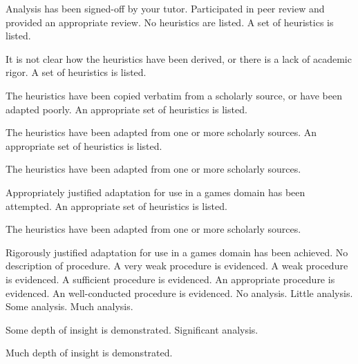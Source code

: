 \documentclass{../fal_assignment}
\begin{document}
\begin{markingrubric}
%
        \grade 		Analysis has been signed-off by your tutor.
%
        \grade 		Participated in peer review and provided an appropriate review.
%
        \grade\fail 	No heuristics are listed.
        \grade 		A set of heuristics is listed.
        \par 		It is not clear how the heuristics have been derived, or there is a lack of academic rigor.
        \grade 		A set of heuristics is listed.
        \par 		The heuristics have been copied verbatim from a scholarly source, or have been adapted poorly.
        \grade 		An appropriate set of heuristics is listed.
        \par 		The heuristics have been adapted from one or more scholarly sources.
        \grade 		An appropriate set of heuristics is listed.
        \par 		The heuristics have been adapted from one or more scholarly sources.
        \par 		Appropriately justified adaptation for use in a games domain has been attempted.        
        \grade 		An appropriate set of heuristics is listed.
        \par 		The heuristics have been adapted from one or more scholarly sources.
        \par 		Rigorously justified adaptation for use in a games domain has been achieved.    
%
        \grade\fail 	No description of procedure.
        \grade 		A very weak procedure is evidenced.
        \grade 		A weak procedure is evidenced.
        \grade 		A sufficient procedure is evidenced.
        \grade 		An appropriate procedure is evidenced.
        \grade 		An well-conducted procedure is evidenced.
%
        \grade\fail 	No analysis.
        \grade 		Little analysis.
        \grade 		Some analysis.
        \grade 		Much analysis.
        \par 		Some depth of insight is demonstrated.
        \grade 		Significant analysis.
        \par 		Much depth of insight is demonstrated.

\end{markingrubric}
\end{document}

